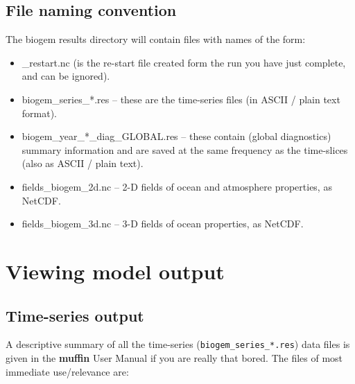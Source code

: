 \documentclass[11pt,fleqn]{book} %
\begin{document}

\subsection{File naming convention}

The \textsf{\footnotesize biogem} results directory will contain files with names of the form:

\begin{itemize}[noitemsep]
\setlength{\itemindent}{.2in}
\item  \textsf{\footnotesize \_restart.nc} (is the re-start file created form the run you have just complete, and can be ignored).
\item \textsf{\footnotesize biogem\_series\_*.res} – these are the time-series files (in ASCII / plain text format).
\item \textsf{\footnotesize biogem\_year\_*\_diag\_GLOBAL.res} – these contain (global diagnostics) summary information and are saved at the same frequency as the time-slices (also as ASCII / plain text).
\item \textsf{\footnotesize fields\_biogem\_2d.nc} – 2-D fields of ocean and atmosphere properties, as NetCDF.
\item \textsf{\footnotesize fields\_biogem\_3d.nc} – 3-D fields of ocean properties, as NetCDF.
\end{itemize}


\newpage


\section{Viewing model output}


\subsection{Time-series output}

A descriptive summary of all the time-series (\texttt{biogem\_series\_*.res}) data files is given in the \textbf{muffin} User Manual if you are really that bored. The files of most immediate use/relevance are:
\end{document}
